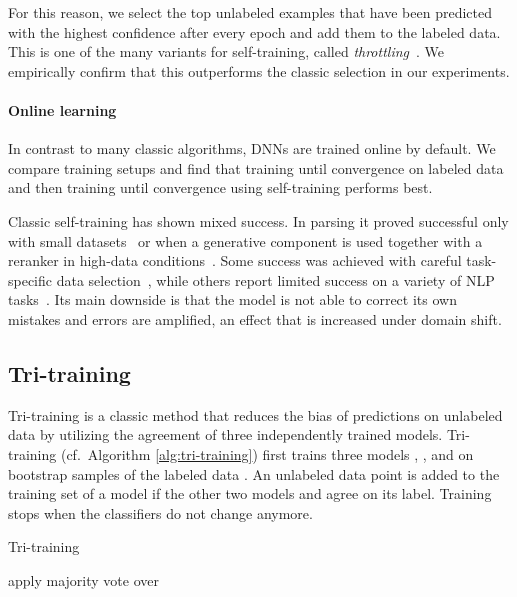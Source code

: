 \documentclass[11pt,a4paper]{article}
\begin{document}
For this reason, we select the top  unlabeled examples that have been predicted with the highest confidence after every epoch and add them to the labeled data. This is one of the many variants for self-training, called \textit{throttling}~\cite{Abney2007}.
We empirically confirm that this outperforms the classic selection in our experiments.

\paragraph{Online learning} In contrast to many classic algorithms, DNNs are trained online by default. We compare training setups and find that training until convergence on labeled data and then training until convergence using self-training performs best.

Classic self-training has shown mixed success. In parsing it proved successful only with small datasets~\cite{reichart2007self} or when a generative component is used together with a reranker in high-data conditions~\cite{McClosky2006,suzuki2008semi}. Some success was achieved with careful task-specific data selection~\cite{Petrov2012}, while others report limited success on a variety of NLP tasks~\cite{
Plank2011,VanAsch2016,Vandergoot2017}. 
Its main downside is that the model is not able to correct its own mistakes and errors are amplified, an effect that is increased under domain shift.




\subsection{Tri-training}

Tri-training \cite{Zhou2005} is a classic method that reduces the bias of predictions on unlabeled data by utilizing the agreement of three independently trained models. Tri-training (cf.\ Algorithm \ref{alg:tri-training}) first trains three models , , and  on bootstrap samples of the labeled data . An unlabeled data point is added to the training set of a model  if the other two models  and  agree on its label. Training stops when the classifiers do not change anymore. 

\begin{algorithm}
\caption{Tri-training \cite{Zhou2005}}\label{alg:tri-training}
\begin{algorithmic}[1]
\For {}
\State 
\State 
\EndFor
\Repeat
	\For {}
        \State 
		\For {}
            \If {}
            	\State 
            \EndIf
        \EndFor
        
	\EndFor
{}
\State apply majority vote over 
\end{algorithmic}
\end{algorithm}
\end{document}
